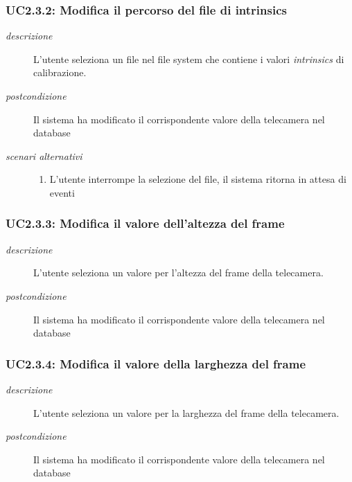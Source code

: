 \subsubsection{UC2.3.2: Modifica il percorso del file di intrinsics} \label{sec:UC2.3.2}
\begin{description}
\item[\em{descrizione }]L'utente seleziona un file nel file system che contiene i valori \textit{intrinsics} di calibrazione.
\item[\em{postcondizione }] Il sistema ha modificato il corrispondente valore della telecamera nel database
\item[\em{scenari alternativi }] \mbox{}

  \begin{enumerate}
\item L'utente interrompe la selezione del file, il sistema ritorna in attesa di eventi
\end{enumerate}
\end{description}

\subsubsection{UC2.3.3: Modifica il valore dell'altezza del frame} \label{sec:UC2.3.3}
\begin{description}
\item[\em{descrizione }]L'utente seleziona un valore per l'altezza del frame della telecamera.
\item[\em{postcondizione }] Il sistema ha modificato il corrispondente valore della telecamera nel database
\end{description}

\subsubsection{UC2.3.4: Modifica il valore della larghezza del frame} \label{sec:UC2.3.4}
\begin{description}
\item[\em{descrizione }]L'utente seleziona un valore per la larghezza del frame della telecamera.
\item[\em{postcondizione }] Il sistema ha modificato il corrispondente valore della telecamera nel database
\end{description}

